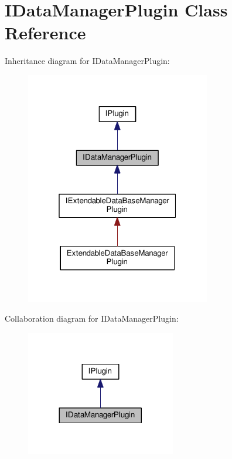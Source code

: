 \hypertarget{class_i_data_manager_plugin}{}\section{I\+Data\+Manager\+Plugin Class Reference}
\label{class_i_data_manager_plugin}


Inheritance diagram for I\+Data\+Manager\+Plugin\+:\nopagebreak
\begin{figure}[H]
\begin{center}
\leavevmode
\includegraphics[width=229pt]{class_i_data_manager_plugin__inherit__graph}
\end{center}
\end{figure}


Collaboration diagram for I\+Data\+Manager\+Plugin\+:\nopagebreak
\begin{figure}[H]
\begin{center}
\leavevmode
\includegraphics[width=185pt]{class_i_data_manager_plugin__coll__graph}
\end{center}
\end{figure}

